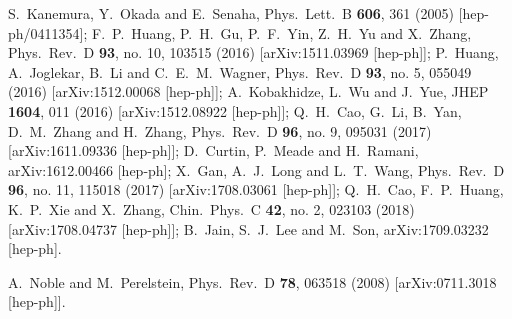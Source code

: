 \documentclass[aps,prd,11pt,tightenlines,superscriptaddress,nofootinbib,preprintnumbers,notitlepage]{revtex4-1}
\begin{document}
\begin{thebibliography}{99}
  
  S.~Kanemura, Y.~Okada and E.~Senaha,
  Phys.\ Lett.\ B {\bf 606}, 361 (2005)
  [hep-ph/0411354];
  F.~P.~Huang, P.~H.~Gu, P.~F.~Yin, Z.~H.~Yu and X.~Zhang,
  Phys.\ Rev.\ D {\bf 93}, no. 10, 103515 (2016)
  [arXiv:1511.03969 [hep-ph]];
  P.~Huang, A.~Joglekar, B.~Li and C.~E.~M.~Wagner,
  Phys.\ Rev.\ D {\bf 93}, no. 5, 055049 (2016)
  [arXiv:1512.00068 [hep-ph]];
  A.~Kobakhidze, L.~Wu and J.~Yue,
  JHEP {\bf 1604}, 011 (2016)
  [arXiv:1512.08922 [hep-ph]];
  Q.~H.~Cao, G.~Li, B.~Yan, D.~M.~Zhang and H.~Zhang,
  Phys.\ Rev.\ D {\bf 96}, no. 9, 095031 (2017)
  [arXiv:1611.09336 [hep-ph]];
  D.~Curtin, P.~Meade and H.~Ramani,
  arXiv:1612.00466 [hep-ph];
  X.~Gan, A.~J.~Long and L.~T.~Wang,
  Phys.\ Rev.\ D {\bf 96}, no. 11, 115018 (2017)
  [arXiv:1708.03061 [hep-ph]];
  Q.~H.~Cao, F.~P.~Huang, K.~P.~Xie and X.~Zhang,
  Chin.\ Phys.\ C {\bf 42}, no. 2, 023103 (2018)
  [arXiv:1708.04737 [hep-ph]];
  B.~Jain, S.~J.~Lee and M.~Son,
  arXiv:1709.03232 [hep-ph].
  
  A.~Noble and M.~Perelstein,
  Phys.\ Rev.\ D {\bf 78}, 063518 (2008)
  [arXiv:0711.3018 [hep-ph]].
  

\end{thebibliography}
\end{document}
